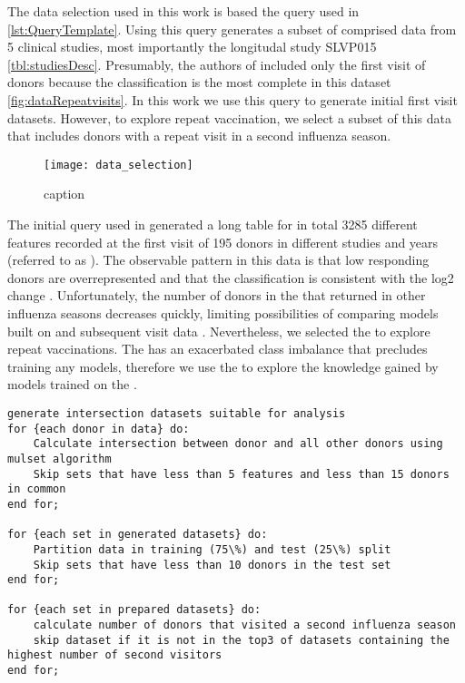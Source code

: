 The data selection used in this work is based the query used in \spaper
\autoref{lst:QueryTemplate}. Using this query generates a subset of \flup
comprised data from 5 clinical studies, most importantly the longitudal study
SLVP015 \autoref{tbl:studiesDesc}. Presumably, the authors of \spaper included
only the first visit of donors because the classification is the most complete
in this dataset \autoref{fig:dataRepeatvisits}. In this work we use this query
to generate initial first visit datasets. However, to explore repeat vaccination,
we select a subset of this data that includes donors with a repeat visit in a
second influenza season.

\begin{figure}[htpb]
    \texttt{[image: data\_selection]}
    \caption{caption}\label{fig:dataRepeatvisits}
\end{figure}

The initial query used in \spaper generated a long table for in total 3285
different features recorded at the first visit of 195 donors in different
studies and years (referred to as \firstvis). The observable pattern in this
data is that low responding donors are overrepresented and that the
classification is consistent with the log2 \gmt change
. Unfortunately, the number of donors in the
\firstvis that returned in other influenza seasons  decreases quickly, limiting
possibilities of comparing models built on \firstvis and subsequent visit data
. Nevertheless, we selected the \secondvis to
explore repeat vaccinations. The \secondvis has an exacerbated class imbalance
that precludes training any models, therefore we use the \secondvis to explore the
knowledge gained by models trained on the \firstvis
{}.

\begin{minipage}{\linewidth}

\begin{lstlisting}[caption=Applying the mulset algorithm and preparing the data, label={lst:mulsetStep}]
generate intersection datasets suitable for analysis
for {each donor in data} do:
    Calculate intersection between donor and all other donors using mulset algorithm
    Skip sets that have less than 5 features and less than 15 donors in common
end for;

for {each set in generated datasets} do:
    Partition data in training (75\%) and test (25\%) split
    Skip sets that have less than 10 donors in the test set
end for;

for {each set in prepared datasets} do:
    calculate number of donors that visited a second influenza season
    skip dataset if it is not in the top3 of datasets containing the highest number of second visitors
end for;
\end{lstlisting}
\end{minipage}

